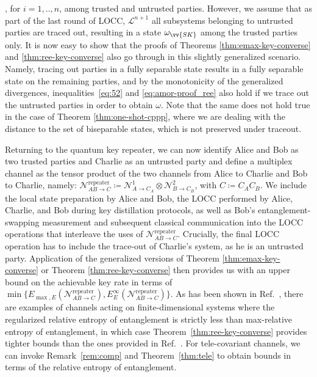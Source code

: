 \documentclass[aps,pra,twocolumn,superscriptaddress,longbibliography]{revtex4-1}
\newcommand{\mc}[1]{\mathcal{#1}}
\begin{document}
\begin{appendix}
, for $i=1,..,n$, among trusted and untrusted parties. However, we assume that as part of the last round of LOCC, $\mc{L}^{n+1}$ all subsystems belonging to untrusted parties are traced out, resulting in a state $\omega_{\vv{SK}}$ among the trusted parties only. It is now easy to show that the proofs of Theorems \ref{thm:emax-key-converse} and \ref{thm:ree-key-converse}  also go through in this slightly generalized scenario. Namely, tracing out parties in a fully separable state results in a fully separable state on the remaining parties, and by the monotonicity of the generalized divergences, inequalities~\eqref{eq:52} and \eqref{eq:amor-proof_ree} also hold if we trace out the untrusted parties in order to obtain $\omega$. Note that the same does not hold true in the case of Theorem \ref{thm:one-shot-cppp}, where we are dealing with the distance to the set of biseparable states, which is not preserved under traceout. 

Returning to the quantum key repeater, we can now identify Alice and Bob as two trusted parties and Charlie as an untrusted party and define a multiplex channel as the tensor product of the two channels from Alice to Charlie and Bob to Charlie, namely: $\mc{N}^{\text{repeater}}_{AB\to C}\coloneqq {\mc N}^1_{A\to C_A}\otimes{\mc N}^2_{B\to C_B}$, with $C\coloneqq C_AC_B$. We include the local state preparation by Alice and Bob, the LOCC performed by Alice, Charlie, and Bob during key distillation protocols, as well as Bob's entanglement-swapping measurement and subsequent classical communication into the LOCC operations that interleave the uses of $\mc{N}^{\text{repeater}}_{AB\to C}$. Crucially, the final LOCC operation has to include the trace-out of Charlie's system, as he is an untrusted party. %
 Application of the generalized versions of Theorem \ref{thm:emax-key-converse} or Theorem \ref{thm:ree-key-converse} then provides us with an upper bound on the achievable key rate in terms of $\min\{ E_{\max,E}(\mc{N}^{\text{repeater}}_{AB\to C}),E^{\infty}_{E}(\mc{N}^{\text{repeater}}_{AB\to C})\}$. As has been shown in Ref.~\cite{FF19}, there are examples of channels acting on finite-dimensional systems where the regularized relative entropy of entanglement is strictly less than max-relative entropy of entanglement, in which case Theorem~\ref{thm:ree-key-converse} provides tighter bounds than the ones provided in Ref.~\cite{CM17}. For tele-covariant channels, we can invoke Remark~\ref{rem:comp} and Theorem~\ref{thm:tele} to obtain bounds in terms of the relative entropy of entanglement.  
 


\end{appendix}
\end{document}
